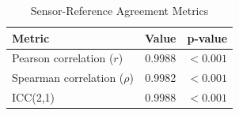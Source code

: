 
\begin{table}[h]
\centering
\caption{Sensor-Reference Agreement Metrics}
\label{tab:agreement}
\begin{tabular}{lcc}
\hline
\textbf{Metric} & \textbf{Value} & \textbf{p-value} \\
\hline
Pearson correlation ($r$) & 0.9988 & $<0.001$ \\
Spearman correlation ($\rho$) & 0.9982 & $<0.001$ \\
ICC(2,1) & 0.9988 & $<0.001$ \\
\hline
\end{tabular}
\end{table}
